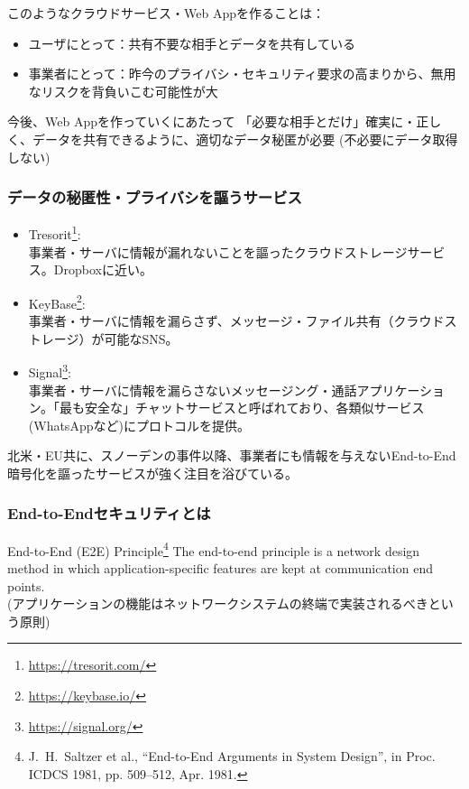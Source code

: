 \documentclass[12pt,dvipdfmx]{beamer}
\begin{document}
\begin{frame}
このようなクラウドサービス・Web Appを作ることは：

\begin{itemize}
\item ユーザにとって：共有不要な相手とデータを共有している
\item 事業者にとって：昨今のプライバシ・セキュリティ要求の高まりから、\alert{無用なリスクを背負いこむ可能性が大}
\end{itemize}

\begin{alertblock}{\small 今後、Web Appを作っていくにあたって}
「必要な相手とだけ」確実に・正しく、データを共有できるように、適切なデータ秘匿が必要 (不必要にデータ取得しない)
\end{alertblock}
\end{frame}

\begin{frame}
\frametitle{データの秘匿性・プライバシを謳うサービス}
\small 
\begin{itemize}
\item Tresorit\footnote[frame]{\scriptsize \url{https://tresorit.com/}}:\\
事業者・サーバに情報が漏れないことを謳ったクラウドストレージサービス。Dropboxに近い。

\item KeyBase\footnote[frame]{\scriptsize \url{https://keybase.io/}}:\\
事業者・サーバに情報を漏らさず、メッセージ・ファイル共有（クラウドストレージ）が可能なSNS。

\item Signal\footnote[frame]{\scriptsize \url{https://signal.org/}}:\\
事業者・サーバに情報を漏らさないメッセージング・通話アプリケーション。「最も安全な」チャットサービスと呼ばれており、各類似サービス(WhatsAppなど)にプロトコルを提供。
\end{itemize}

北米・EU共に、スノーデンの事件以降、事業者にも情報を与えない\alert{End-to-End暗号化}を謳ったサービスが強く注目を浴びている。
\end{frame}

\begin{frame}
\frametitle{End-to-Endセキュリティとは}
\begin{block}{End-to-End (E2E) Principle\footnote[frame]{\scriptsize J.~H.~Saltzer et al.\@, ``End-to-End Arguments in System Design'', in Proc. ICDCS 1981, pp. 509--512, Apr. 1981.}}
The end-to-end principle is a network design method in which \alert{application-specific features are kept at communication end points}.\\[1ex]
(アプリケーションの機能はネットワークシステムの\alert{終端}で実装されるべきという原則)
\end{block}
\end{frame}
\end{document}

